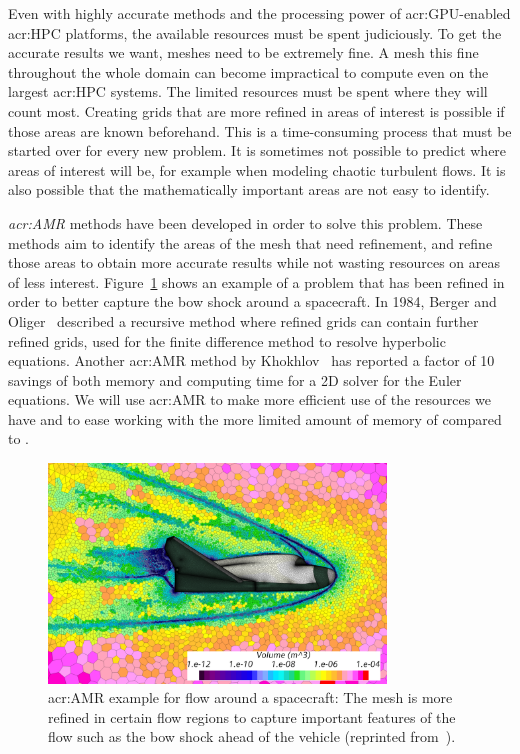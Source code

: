 Even with highly accurate methods and the processing power of \acrshort{acr:GPU}-enabled
\acrshort{acr:HPC} platforms, the available resources must be spent judiciously. To get the accurate
results we want, meshes need to be extremely fine. A mesh this fine throughout the whole domain can
become impractical to compute even on the largest \acrshort{acr:HPC} systems. The limited resources
must be spent where they will count most. Creating grids that are more refined in areas of interest
is possible if those areas are known beforehand. This is a time-consuming process that must be
started over for every new problem. It is sometimes not possible to predict where areas of interest
will be, for example when modeling chaotic turbulent flows. It is also possible that the
mathematically important areas are not easy to identify. 

\textit{\Acrfull{acr:AMR}} methods have been developed in order to solve this problem. These methods
aim to identify the areas of the mesh that need refinement, and refine those areas to obtain more
accurate results while not wasting resources on areas of less interest. Figure~\ref{fig:intro_amr}
shows an example of a problem that has been refined in order to better capture the bow shock around
a spacecraft. In 1984, Berger and Oliger~\cite{Berger1984} described a recursive method where
refined grids can contain further refined grids, used for the finite difference method to resolve
hyperbolic equations. Another \acrshort{acr:AMR} method by Khokhlov~\cite{Khokhlov1998} has reported
a factor of 10 savings of both memory and computing time for a 2D solver for the Euler equations. We
will use \acrlong{acr:AMR} to make more efficient use of the resources we have and to ease working
with the more limited amount of memory of  compared to .

\begin{figure}[H]
    \centering
    \includegraphics[width=0.8\textwidth]{Chapter_introduction/media/adaptive_mesh_refinement}
    \caption{\Acrlong{acr:AMR} example for flow around a spacecraft: The mesh is more refined in certain flow regions to capture important features of the flow such as the bow shock ahead of the vehicle (reprinted from~\cite{Siemens2020}).}\label{fig:intro_amr}
\end{figure}

